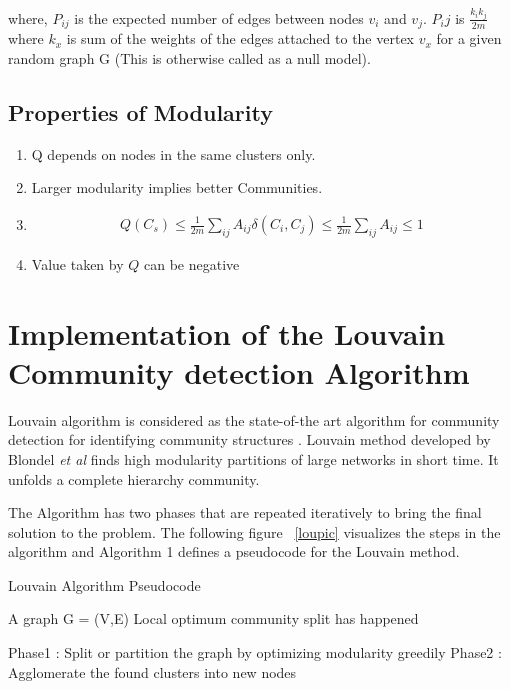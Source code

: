 where, $P_{ij}$ is the expected number of edges between nodes $v_i$ and $v_j$. $P_ij$ is $\frac{k_ik_j}{2m}$ where $k_x$ is sum of the weights of the edges attached to the vertex $v_x$ for a given random graph G (This is otherwise called as a null model).
    
\subsection{Properties of Modularity}
\begin{enumerate}
 \item Q depends on nodes in the same clusters only. 
  \item Larger modularity implies better Communities.
    \item 
    \begin{equation}
    \begin{split}
Q(C_s) \leq \frac{1}{2m} \sum_{ij} A_{ij} \delta(C_i,C_j) \leq \frac{1}{2m} \sum_{ij} A_{ij} \leq 1
\end{split}
    \end{equation}
 \item Value taken by $Q$ can be negative
 \end{enumerate}
 
\section{Implementation of the Louvain Community detection Algorithm}
 Louvain algorithm is considered as the state-of-the art algorithm for community detection for identifying community structures \cite{Louvain}. Louvain method developed by Blondel \textit{et al} \cite{Louvain} finds high modularity partitions of large networks in short time. It unfolds a complete hierarchy community. 
 

\par  
 The Algorithm has two phases that are repeated iteratively to bring the final solution to the problem. The following figure ~\ref{loupic} visualizes the steps in the algorithm and 
 Algorithm 1 defines a pseudocode for the Louvain method. 
\begin{algorithm}[H]
\caption{Louvain Algorithm Pseudocode}
\begin{algorithmic} 
\REQUIRE A graph G = (V,E)
\ENSURE Local optimum community split has happened

\STATE Phase1 : Split or partition the graph by optimizing modularity greedily
\STATE Phase2 : Agglomerate the found clusters into new nodes
\ENDWHILE
\end{algorithmic}
\end{algorithm}


